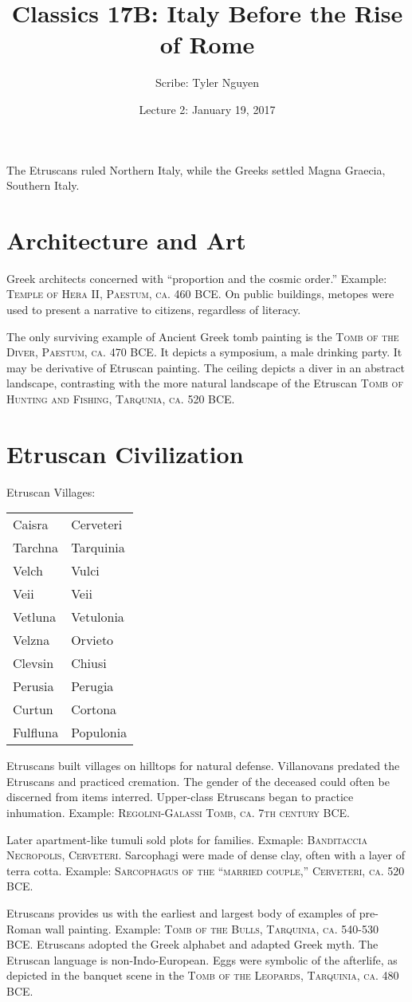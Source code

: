 \documentclass{article}
\begin{document}
\title{Classics 17B: Italy Before the Rise of Rome}
\author{Scribe: Tyler Nguyen}
\date{Lecture 2: January 19, 2017}
\maketitle
The Etruscans ruled Northern Italy, while the Greeks settled Magna Graecia, Southern Italy.
\section{Architecture and Art}
Greek architects concerned with ``proportion and the cosmic order.'' Example: \textsc{Temple of Hera II, Paestum, ca. 460 BCE}.  On public buildings, metopes were used to present a narrative to citizens, regardless of literacy.

The only surviving example of Ancient Greek tomb painting is the \textsc{Tomb of the Diver, Paestum, ca. 470 BCE}.  It depicts a symposium, a male drinking party. It may be derivative of Etruscan painting.  The ceiling depicts a diver in an abstract landscape, contrasting with the more natural landscape of the Etruscan \textsc{Tomb of Hunting and Fishing, Tarqunia, ca. 520 BCE}.
\section{Etruscan Civilization}
Etruscan Villages:\\
\begin{tabular}{ll}
Caisra & Cerveteri\\
Tarchna & Tarquinia\\
Velch & Vulci\\
Veii & Veii\\
Vetluna & Vetulonia\\
Velzna & Orvieto\\
Clevsin & Chiusi\\
Perusia & Perugia\\
Curtun & Cortona\\
Fulfluna & Populonia\\
\end{tabular}

Etruscans built villages on hilltops for natural defense. Villanovans predated the Etruscans and practiced cremation. The gender of the deceased could often be discerned from items interred. Upper-class Etruscans began to practice inhumation. Example: \textsc{Regolini-Galassi Tomb, ca. 7th century BCE}.

Later apartment-like tumuli sold plots for families. Exmaple: \textsc{Banditaccia Necropolis, Cerveteri}. Sarcophagi were made of dense clay, often with a layer of terra cotta. Example: \textsc{Sarcophagus of the ``married couple,'' Cerveteri, ca. 520 BCE}.

Etruscans provides us with the earliest and largest body of examples of pre-Roman wall painting. Example: \textsc{Tomb of the Bulls, Tarquinia, ca. 540-530 BCE}. Etruscans adopted the Greek alphabet and adapted Greek myth.  The Etruscan language is non-Indo-European. Eggs were symbolic of the afterlife, as depicted in the banquet scene in the \textsc{Tomb of the Leopards, Tarquinia, ca. 480 BCE}.
\end{document}
